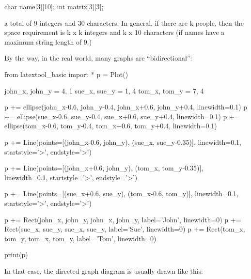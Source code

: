 \begin{consolethree}[escapeinside=||]
char name[3][10];
int matrix[3][3];
\end{consolethree}

a total of 9 integers and 30 characters. In general, if there are k
people, then the space requirement is k x k integers and k x 10
characters (if names have a maximum string length of 9.)






By the way, in the real world, many graphs are ``bidirectional'':

\begin{python}
from latextool_basic import *
p = Plot()

john_x, john_y = 4, 1
sue_x, sue_y = 1, 4
tom_x, tom_y = 7, 4

p += ellipse(john_x-0.6, john_y-0.4, john_x+0.6, john_y+0.4, linewidth=0.1)
p += ellipse(sue_x-0.6, sue_y-0.4, sue_x+0.6, sue_y+0.4, linewidth=0.1)
p += ellipse(tom_x-0.6, tom_y-0.4, tom_x+0.6, tom_y+0.4, linewidth=0.1)

p += Line(points=[(john_x-0.6, john_y), (sue_x, sue_y-0.35)], linewidth=0.1, startstyle='>', endstyle='>')

p += Line(points=[(john_x+0.6, john_y), (tom_x, tom_y-0.35)], linewidth=0.1, startstyle='>', endstyle='>')

p += Line(points=[(sue_x+0.6, sue_y), (tom_x-0.6, tom_y)], linewidth=0.1, startstyle='>', endstyle='>')

p += Rect(john_x, john_y, john_x, john_y, label='John', linewidth=0)
p += Rect(sue_x, sue_y, sue_x, sue_y, label='Sue', linewidth=0)
p += Rect(tom_x, tom_y, tom_x, tom_y, label='Tom', linewidth=0)

print(p)
\end{python}

In that case, the directed graph diagram is usually drawn like this:


